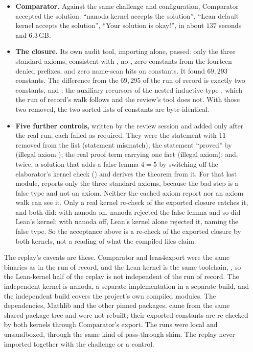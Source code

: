 \documentclass[11pt]{article}
\theoremstyle{definition}
\begin{document}
\begin{itemize}[nosep]
\item \textbf{Comparator.} Against the same challenge and configuration, Comparator accepted the solution: ``nanoda kernel accepts the solution'', ``Lean default kernel accepts the solution'', ``Your solution is okay!'', in about $137$ seconds and $6.3$\,GB.
\item \textbf{The closure.} Its own audit tool, importing  alone, passed: only the three standard axioms, consistent with , no , zero constants from the fourteen denied prefixes, and zero name-scan hits on constants. It found $69{,}293$ constants. The difference from the $69{,}295$ of the run of record is exactly two constants,  and : the auxiliary recursors of the nested inductive type , which the run of record's walk follows and the review's tool does not. With those two removed, the two sorted lists of constants are byte-identical.
\item \textbf{Five further controls,} written by the review session and added only after the real run, each failed as required. They were the statement with $11$ removed from the list (statement mismatch); the statement ``proved'' by  (illegal axiom ); the real proof term carrying one  fact (illegal axiom); and, twice, a solution that adds a false lemma $4 = 5$ by switching off the elaborator's kernel check () and derives the theorem from it. For that last module,  reports only the three standard axioms, because the bad step is a false type and not an axiom. Neither the cached axiom report nor an axiom walk can see it. Only a real kernel re-check of the exported closure catches it, and both did: with nanoda on, nanoda rejected the false lemma and so did Lean's kernel; with nanoda off, Lean's kernel alone rejected it, naming the false type. So the acceptance above is a re-check of the exported closure by both kernels, not a reading of what the compiled files claim.
\end{itemize}

The replay's caveats are these. Comparator and lean4export were the same binaries as in the run of record, and the Lean kernel is the same toolchain, , so the Lean-kernel half of the replay is not independent of the run of record. The independent kernel is nanoda, a separate implementation in a separate build, and the independent build covers the project's own compiled modules. The dependencies, Mathlib and the other pinned packages, came from the same shared package tree and were not rebuilt; their exported constants are re-checked by both kernels through Comparator's export. The runs were local and unsandboxed, through the same kind of pass-through shim. The replay never imported  together with the challenge or a control.
\end{document}
